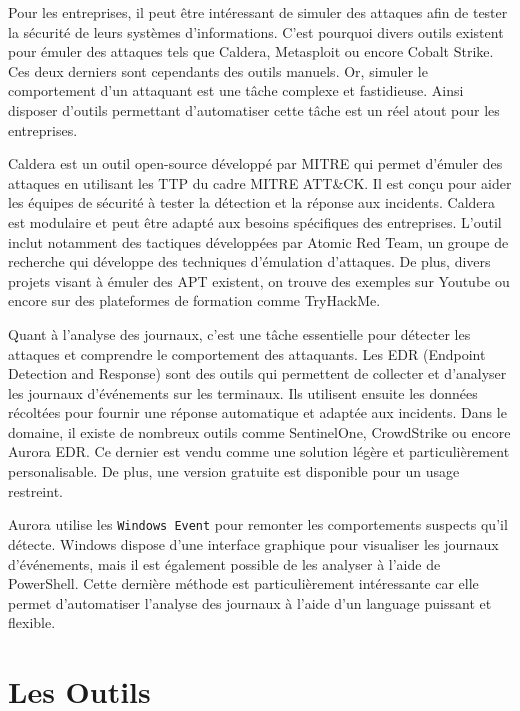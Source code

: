 \documentclass[12pt,letterpaper]{article}
\begin{document}
\bigskip

Pour les entreprises, il peut être intéressant de simuler des attaques afin de tester la sécurité de leurs systèmes d'informations.
C'est pourquoi divers outils existent pour émuler des attaques tels que Caldera, Metasploit ou encore Cobalt Strike.
Ces deux derniers sont cependants des outils manuels. Or, simuler le comportement d'un attaquant est une tâche complexe et fastidieuse.
Ainsi disposer d'outils permettant d'automatiser cette tâche est un réel atout pour les entreprises.

\bigskip

Caldera est un outil open-source développé par MITRE qui permet d'émuler des attaques en utilisant les TTP du cadre MITRE ATT\&CK.
Il est conçu pour aider les équipes de sécurité à tester la détection et la réponse aux incidents.
Caldera est modulaire et peut être adapté aux besoins spécifiques des entreprises.
L'outil inclut notamment des tactiques développées par Atomic Red Team, un groupe de recherche qui développe des techniques d'émulation d'attaques.
De plus, divers projets visant à émuler des APT existent, on trouve des exemples sur Youtube ou encore sur des plateformes de formation comme TryHackMe.

\bigskip

Quant à l'analyse des journaux, c'est une tâche essentielle pour détecter les attaques et comprendre le comportement des attaquants.
Les EDR (Endpoint Detection and Response) sont des outils qui permettent de collecter et d'analyser les journaux d'événements sur les terminaux.
Ils utilisent ensuite les données récoltées pour fournir une réponse automatique et adaptée aux incidents.
Dans le domaine, il existe de nombreux outils comme SentinelOne, CrowdStrike ou encore Aurora EDR.
Ce dernier est vendu comme une solution légère et particulièrement personalisable.
De plus, une version gratuite est disponible pour un usage restreint.

\bigskip

Aurora utilise les \verb|Windows Event| pour remonter les comportements suspects qu'il détecte.
Windows dispose d'une interface graphique pour visualiser les journaux d'événements, mais il est également possible de les analyser à l'aide de PowerShell.
Cette dernière méthode est particulièrement intéressante car elle permet d'automatiser l'analyse des journaux à l'aide d'un language puissant et flexible.

\newpage
\section{Les Outils}
\end{document}
